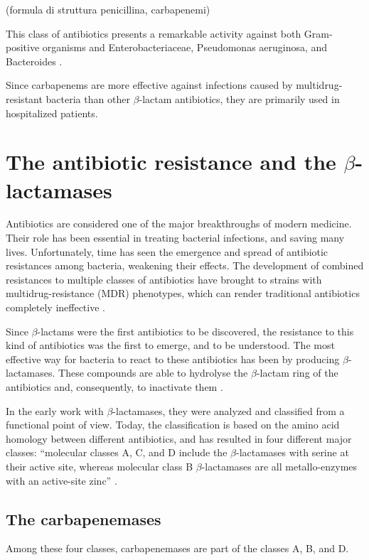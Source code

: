 \documentclass[11pt]{report}
\begin{document}
(formula di struttura penicillina, carbapenemi)

This class of antibiotics presents a remarkable activity against both Gram-positive organisms and Enterobacteriaceae, Pseudomonas aeruginosa, and Bacteroides \cite{Neu1985}.

Since carbapenems are more effective against infections caused by multidrug-resistant bacteria than other $\beta$-lactam antibiotics, they are primarily used in hospitalized patients.

\chapter{The antibiotic resistance and the $\beta$-lactamases}

Antibiotics are considered one of the major breakthroughs of modern medicine. Their role has been essential in treating bacterial infections, and saving many lives. Unfortunately, time has seen the emergence and spread of antibiotic resistances among bacteria, weakening their effects. The development of combined resistances to multiple classes of antibiotics have brought to strains with multidrug-resistance (MDR) phenotypes, which can render traditional antibiotics completely ineffective \cite{Rossolini2014}.


Since $\beta$-lactams were the first antibiotics to be discovered, the resistance to this kind of antibiotics was the first to emerge, and to be understood. The most effective way for bacteria to react to these antibiotics has been by producing $\beta$-lactamases. These compounds are able to hydrolyse the $\beta$-lactam ring of the antibiotics and, consequently, to inactivate them \cite{KONG2010}.


In the early work with $\beta$-lactamases, they were analyzed and classified from a functional point of view. Today, the classification is based on the amino acid homology between different antibiotics, and has resulted in four different major classes: “molecular classes A, C, and D include the $\beta$-lactamases with serine at their active site, whereas molecular class B $\beta$-lactamases are all metallo-enzymes with an active-site zinc” \cite{Queenan2007}.


\section{The carbapenemases}
Among these four classes, carbapenemases are part of the classes A, B, and D.
\end{document}
